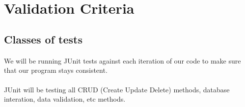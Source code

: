 \documentclass{article}
\begin{document}

\section{Validation Criteria}

\subsection{Classes of tests}
\paragraph{}
We will be running JUnit tests against each iteration of our code to make sure that our program stays consistent.

\paragraph{}
JUnit will be testing all CRUD (Create Update Delete) methods, database interation, data validation, etc methods.




\end{document}
